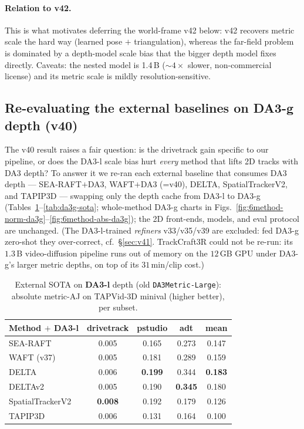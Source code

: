 \documentclass[11pt,a4paper]{article}
\begin{document}
\paragraph{Relation to v42.}
This is what motivates deferring the world-frame v42 below: v42 recovers metric scale the hard way (learned
pose $+$ triangulation), whereas the far-field problem is dominated by a depth-model scale bias that the
bigger depth model fixes directly. Caveats: the nested model is 1.4\,B ($\sim$$4\times$ slower,
non-commercial license) and its metric scale is mildly resolution-sensitive.

\subsection{Re-evaluating the external baselines on DA3-g depth (v40)}
\label{sec:da3g-reeval}
The v40 result raises a fair question: is the drivetrack gain specific to our pipeline, or does the DA3-l
scale bias hurt \emph{every} method that lifts 2D tracks with DA3 depth? To answer it we re-ran each
external baseline that consumes DA3 depth --- SEA-RAFT$+$DA3, WAFT$+$DA3 (=v40), DELTA, SpatialTrackerV2,
and TAPIP3D --- swapping only the depth cache from DA3-l to DA3-g
(Tables~\ref{tab:da3l-sota}--\ref{tab:da3g-sota}; whole-method DA3-g charts in
Figs.~\ref{fig:6method-norm-da3g}--\ref{fig:6method-abs-da3g}); the 2D
front-ends, models, and eval protocol are unchanged. (The DA3-l-trained \emph{refiners} v33/v35/v39 are
excluded: fed DA3-g zero-shot they over-correct, cf.\ \S\ref{sec:v41}. TrackCraft3R could not be
re-run: its $1.3$\,B video-diffusion pipeline runs out of memory on the $12$\,GB GPU under DA3-g's
larger metric depths, on top of its $31$\,min/clip cost.)

\begin{table}[h]
\centering
\caption{External SOTA on \textbf{DA3-l} depth (old \texttt{DA3Metric-Large}): absolute metric-AJ on
TAPVid-3D minival (higher better), per subset.}
\label{tab:da3l-sota}
\begin{tabular}{lcccc}
\toprule
Method $+$ DA3-l & drivetrack & pstudio & adt & mean \\
\midrule
SEA-RAFT         & 0.005 & 0.165 & 0.273 & 0.147 \\
WAFT (v37)       & 0.005 & 0.181 & 0.289 & 0.159 \\
DELTA            & 0.006 & \textbf{0.199} & 0.344 & \textbf{0.183} \\
DELTAv2          & 0.005 & 0.190 & \textbf{0.345} & 0.180 \\
SpatialTrackerV2 & \textbf{0.008} & 0.192 & 0.179 & 0.126 \\
TAPIP3D          & 0.006 & 0.131 & 0.164 & 0.100 \\
\bottomrule
\end{tabular}
\end{table}
\end{document}
